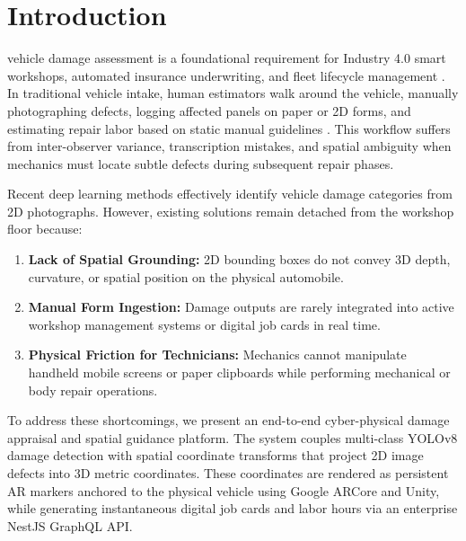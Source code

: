 \documentclass[10pt,journal,compsoc]{IEEEtran}
\begin{document}
\maketitle
\IEEEdisplaynontitleabstractindextext
\IEEEpeerreviewmaketitle

\section{Introduction}
 vehicle damage assessment is a foundational requirement for Industry 4.0 smart workshops, automated insurance underwriting, and fleet lifecycle management \cite{industry40_repair}. In traditional vehicle intake, human estimators walk around the vehicle, manually photographing defects, logging affected panels on paper or 2D forms, and estimating repair labor based on static manual guidelines \cite{deutz2020estimating}. This workflow suffers from inter-observer variance, transcription mistakes, and spatial ambiguity when mechanics must locate subtle defects during subsequent repair phases.

Recent deep learning methods \cite{cardd2023, yolo_damage2022} effectively identify vehicle damage categories from 2D photographs. However, existing solutions remain detached from the workshop floor because:
\begin{enumerate}
    \item \textbf{Lack of Spatial Grounding:} 2D bounding boxes do not convey 3D depth, curvature, or spatial position on the physical automobile.
    \item \textbf{Manual Form Ingestion:} Damage outputs are rarely integrated into active workshop management systems or digital job cards in real time.
    \item \textbf{Physical Friction for Technicians:} Mechanics cannot manipulate handheld mobile screens or paper clipboards while performing mechanical or body repair operations.
\end{enumerate}

To address these shortcomings, we present an end-to-end cyber-physical damage appraisal and spatial guidance platform. The system couples multi-class YOLOv8 damage detection with spatial coordinate transforms that project 2D image defects into 3D metric coordinates. These coordinates are rendered as persistent AR markers anchored to the physical vehicle using Google ARCore and Unity, while generating instantaneous digital job cards and labor hours via an enterprise NestJS GraphQL API.
\end{document}
